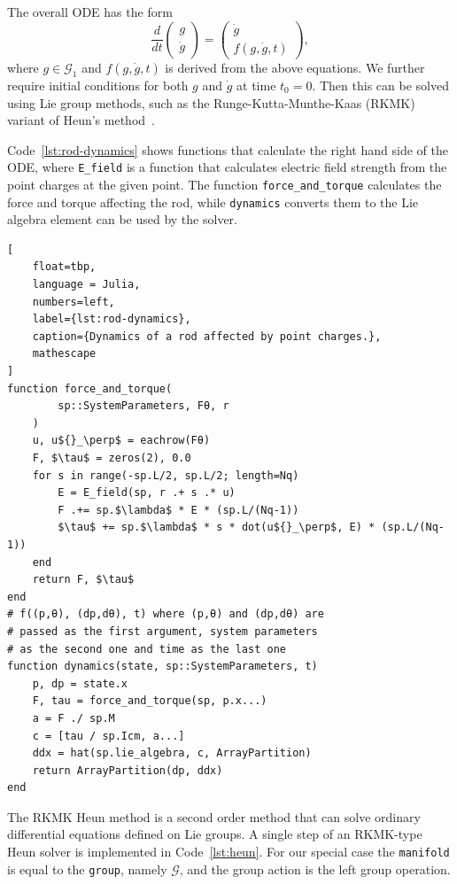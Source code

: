 \documentclass{juliacon}
\begin{document}
The overall ODE has the form
\begin{equation*}
    \frac{d}{dt}\begin{pmatrix} g \\ \dot{g} \end{pmatrix}
    = \begin{pmatrix} \dot{g} \\ f(g, \dot{g}, t) \end{pmatrix},
\end{equation*}
where \(g \in \mathcal G_1\) and \(f(g, \dot{g}, t)\) is derived from the above equations. We further require initial conditions for both \(g\) and \(\dot{g}\) at time \(t_0=0\).
Then this can be solved using Lie group methods, such as the Runge-Kutta-Munthe-Kaas (RKMK) variant \cite{Munthe-Kaas:1998} of Heun's method~\cite[App.~A.1]{IserlesMunthe-KaasNoersettZanna:2000}.

Code~\ref{lst:rod-dynamics} shows functions that calculate the right hand side of the ODE, where \lstinline{E_field} is a function that calculates electric field strength from the point charges at the given point.
The function \lstinline{force_and_torque} calculates the force and torque affecting the rod, while \lstinline{dynamics} converts them to the Lie algebra element can be used by the solver.
\begin{lstlisting}[
    float=tbp,
    language = Julia,
    numbers=left,
    label={lst:rod-dynamics},
    caption={Dynamics of a rod affected by point charges.},
    mathescape
]
function force_and_torque(
        sp::SystemParameters, Fθ, r
    )
    u, u${}_\perp$ = eachrow(Fθ)
    F, $\tau$ = zeros(2), 0.0
    for s in range(-sp.L/2, sp.L/2; length=Nq)
        E = E_field(sp, r .+ s .* u)
        F .+= sp.$\lambda$ * E * (sp.L/(Nq-1))
        $\tau$ += sp.$\lambda$ * s * dot(u${}_\perp$, E) * (sp.L/(Nq-1))
    end
    return F, $\tau$
end
# f((p,θ), (dp,dθ), t) where (p,θ) and (dp,dθ) are
# passed as the first argument, system parameters
# as the second one and time as the last one
function dynamics(state, sp::SystemParameters, t)
    p, dp = state.x
    F, tau = force_and_torque(sp, p.x...)
    a = F ./ sp.M
    c = [tau / sp.Icm, a...]
    ddx = hat(sp.lie_algebra, c, ArrayPartition)
    return ArrayPartition(dp, ddx)
end
\end{lstlisting}

The RKMK Heun method is a second order method that can solve ordinary differential equations defined on Lie groups.
A single step of an RKMK-type Heun solver is implemented in Code~\ref{lst:heun}.
For our special case the \verb|manifold| is equal to the \verb|group|, namely $\mathcal G$, and the group action is the left group operation.
\end{document}
